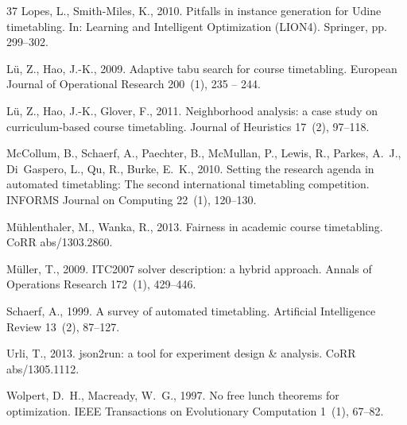 \documentclass[authoryear,12pt]{article}
\begin{document}
\begin{thebibliography}{37}
Lopes, L., Smith-Miles, K., 2010. Pitfalls in instance generation for {U}dine
  timetabling. In: Learning and Intelligent Optimization (LION4). Springer, pp.
  299--302.

L\"u, Z., Hao, J.-K., 2009. Adaptive tabu search for course timetabling.
  European Journal of Operational Research 200~(1), 235 -- 244.

L{\"u}, Z., Hao, J.-K., Glover, F., 2011. Neighborhood analysis: a case study
  on curriculum-based course timetabling. Journal of Heuristics 17~(2),
  97--118.

McCollum, B., Schaerf, A., Paechter, B., McMullan, P., Lewis, R., Parkes,
  A.~J., Di~Gaspero, L., Qu, R., Burke, E.~K., 2010. Setting the research
  agenda in automated timetabling: The second international timetabling
  competition. {INFORMS} Journal on Computing 22~(1), 120--130.

M{\"u}hlenthaler, M., Wanka, R., 2013. Fairness in academic course timetabling.
  CoRR abs/1303.2860.

M\"uller, T., 2009. {ITC2007} solver description: a hybrid approach. Annals of
  Operations Research 172~(1), 429--446.

Schaerf, A., 1999. A survey of automated timetabling. Artificial Intelligence
  Review 13~(2), 87--127.

Urli, T., 2013. json2run: a tool for experiment design {\&} analysis. CoRR
  abs/1305.1112.

Wolpert, D.~H., Macready, W.~G., 1997. No free lunch theorems for optimization.
  IEEE Transactions on Evolutionary Computation 1~(1), 67--82.

\end{thebibliography}
\end{document}

